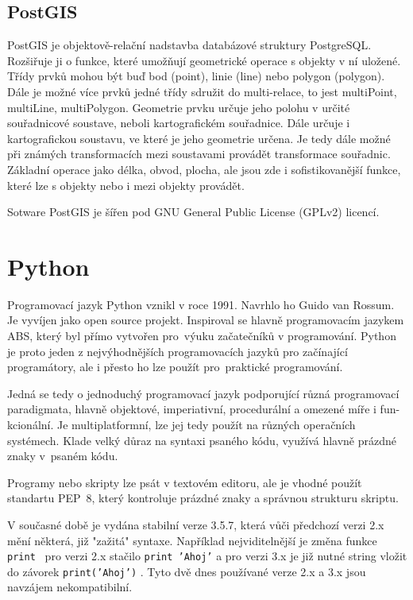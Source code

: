 \subsection{PostGIS}
\label{PostGIS}
PostGIS je objektově-relační nadstavba databázové struktury PostgreSQL.
Rozšiřuje ji o funkce, které umožňují geometrické operace s objekty v ní uložené.
Třídy prvků mohou být buď bod (point), linie (line) nebo polygon (polygon).
Dále je možné více prvků jedné třídy sdružit do multi-relace, 
to jest  multiPoint, multiLine, multiPolygon.
Geometrie prvku určuje jeho polohu v určité souřadnicové soustave, neboli 
kartografickém souřadnice. Dále určuje i kartografickou soustavu, ve které je 
jeho geometrie určena. Je tedy dále možné při známých transformacích mezi
soustavami provádět transformace souřadnic. Základní operace jako délka, obvod,
plocha, ale jsou zde i sofistikovanější funkce, které lze s objekty nebo i mezi 
objekty provádět.

Sotware PostGIS je šířen pod GNU General Public License (GPLv2) licencí.


\section{Python}
\label{Python}
Programovací jazyk Python vznikl v roce 1991. Navrhlo ho Guido van Rossum. 
Je vyvíjen jako open source projekt. Inspiroval se hlavně programovacím jazykem
ABS, který byl přímo vytvořen pro~výuku začatečníků v programování. Python je 
proto jeden z nejvýhodnějších programovacích jazyků pro začínající programátory,
ale i přesto ho lze použít pro~praktické programování. 

Jedná se tedy o jednoduchý programovací jazyk podporující různá programovací 
paradigmata, hlavně objektové, imperiativní, procedurální a omezené míře i 
fun- kcionální. Je multiplatformní, lze jej tedy použít na různých operačních 
systémech. Klade velký důraz na syntaxi psaného kódu, využívá hlavně prázdné 
znaky v~psaném kódu.  

Programy nebo skripty lze psát v textovém editoru, ale je vhodné použít 
standartu PEP~8, který kontroluje prázdné znaky a správnou strukturu skriptu. 

V současné době je vydána stabilní verze 3.5.7, která vůči předchozí verzi 2.x
mění některá, již "zažitá" syntaxe. Například nejviditelnější je změna funkce 
{\tt print } pro verzi 2.x stačilo  {\tt print 'Ahoj'}  a pro verzi 3.x je již
nutné string vložit do závorek  {\tt print('Ahoj')}  . Tyto dvě dnes používané
verze 2.x a 3.x jsou navzájem nekompatibilní.
\cite{python} 
\cite{wikiPython} 
  
